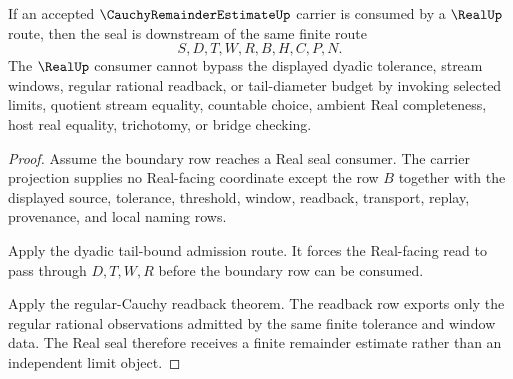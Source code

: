 \begin{theorem}
\label{thm:cauchy-remainder-estimate-real-seal-nonescape}
If an accepted $\CauchyRemainderEstimateUp$ carrier is consumed by a $\RealUp$ route, then the seal is downstream of the same finite route
$$
S,D,T,W,R,B,H,C,P,N .
$$
The $\RealUp$ consumer cannot bypass the displayed dyadic tolerance, stream windows, regular rational readback, or tail-diameter budget by invoking selected limits, quotient stream equality, countable choice, ambient Real completeness, host real equality, trichotomy, or bridge checking.
\end{theorem}
\begin{proof}
Assume the boundary row reaches a Real seal consumer. The carrier projection supplies no Real-facing coordinate except the row $B$ together with the displayed source, tolerance, threshold, window, readback, transport, replay, provenance, and local naming rows.

Apply the dyadic tail-bound admission route. It forces the Real-facing read to pass through $D,T,W,R$ before the boundary row can be consumed.

Apply the regular-Cauchy readback theorem. The readback row exports only the regular rational observations admitted by the same finite tolerance and window data. The Real seal therefore receives a finite remainder estimate rather than an independent limit object.
\end{proof}




